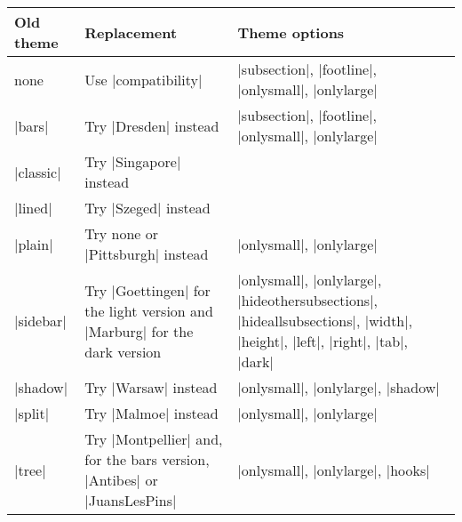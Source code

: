 \medskip
\noindent
\begin{tabular}{@{}l>{\raggedright}p{6.4cm}>{\raggedright\arraybackslash}p{7.6cm}@{}}
  \toprule
  Old theme & Replacement & Theme options \\
  \midrule
  none & Use |compatibility| & |subsection|, |footline|, |onlysmall|, |onlylarge|\\
  |bars| & Try |Dresden| instead & |subsection|, |footline|, |onlysmall|, |onlylarge|\\
  |classic| & Try |Singapore| instead &\\
  |lined| & Try |Szeged| instead & \\
  |plain| & Try none or |Pittsburgh| instead & |onlysmall|, |onlylarge|\\
  |sidebar| & Try |Goettingen| for the light version and |Marburg| for
  the dark version & |onlysmall|, |onlylarge|, |hideothersubsections|, |hideallsubsections|, |width|, |height|, |left|, |right|, |tab|, |dark|\\
  |shadow| & Try |Warsaw| instead & |onlysmall|, |onlylarge|, |shadow|\\
  |split| & Try |Malmoe| instead & |onlysmall|, |onlylarge|\\
  |tree| & Try |Montpellier| and, for the bars version, |Antibes| or
  |JuansLesPins| & |onlysmall|, |onlylarge|, |hooks|\\
  \bottomrule
\end{tabular}
